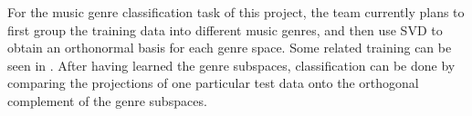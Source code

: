 \begin{par}
    
    For the music genre classification task of this project, the team currently plans to first group the training data into different music genres, and then use SVD to obtain an orthonormal basis for each genre space. Some related training can be seen in \cite{pca}. After having learned the genre subspaces, classification can be done by comparing the projections of one particular test data onto the orthogonal complement of the genre subspaces.
\end{par}